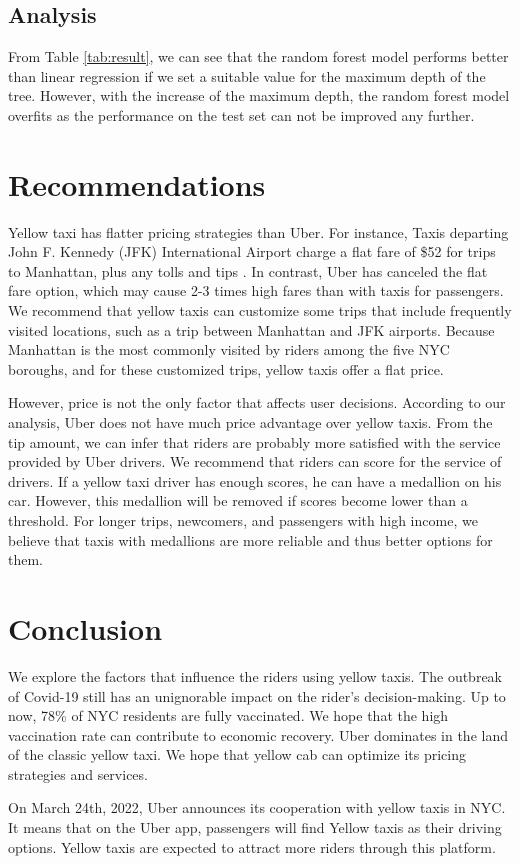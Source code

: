 \documentclass[11pt]{article}
\begin{document}
\subsection{Analysis}
From Table \ref{tab:result}, we can see that the random forest model performs better than linear regression if we set a suitable value for the maximum depth of the tree. However, with the increase of the maximum depth, the random forest model overfits as the performance on the test set can not be improved any further. 


\section{Recommendations}
Yellow taxi has flatter pricing strategies than Uber. For instance, Taxis departing John F. Kennedy (JFK) International Airport charge a flat fare of \$52 for trips to Manhattan, plus any tolls and tips \cite{benefit}. In contrast, Uber has canceled the flat fare option, which may cause 2-3 times high fares than with taxis for passengers. We recommend that yellow taxis can customize some trips that include frequently visited locations, such as a trip between Manhattan and JFK airports. Because Manhattan is the most commonly visited by riders among the five NYC boroughs, and for these customized trips, yellow taxis offer a flat price. 

However, price is not the only factor that affects user decisions. According to our analysis, Uber does not have much price advantage over yellow taxis. From the tip amount, we can infer that riders are probably more satisfied with the service provided by Uber drivers. We recommend that riders can score for the service of drivers. If a yellow taxi driver has enough scores, he can have a medallion on his car. However, this medallion will be removed if scores become lower than a threshold. For longer trips, newcomers, and passengers with high income, we believe that taxis with medallions are more reliable and thus better options for them.


\section{Conclusion}
We explore the factors that influence the riders using yellow taxis. The outbreak of Covid-19 still has an unignorable impact on the rider's decision-making. Up to now, 78\% of NYC residents are fully vaccinated. We hope that the high vaccination rate can contribute to economic recovery. Uber dominates in the land of the classic yellow taxi. We hope that yellow cab can optimize its pricing strategies and services. 

On March 24th, 2022, Uber announces its cooperation with yellow taxis in NYC. It means that on the Uber app, passengers will find Yellow taxis as their driving options. Yellow taxis are expected to attract more riders through this platform.



\clearpage

\printbibliography
\end{document}
